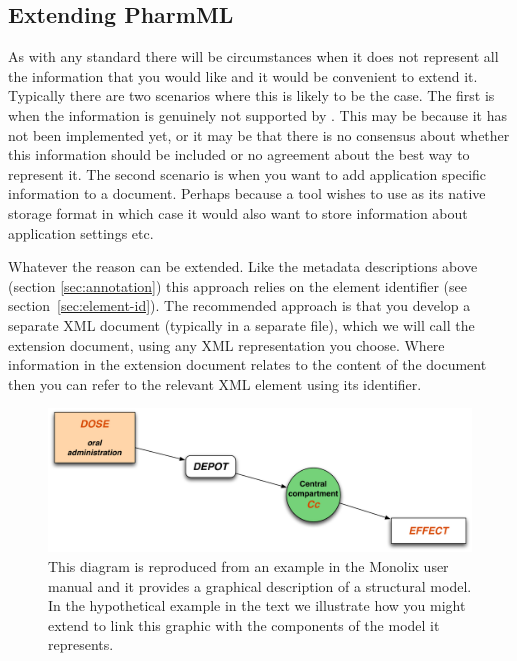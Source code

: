 \subsection{Extending PharmML}
\label{sec:extension}

As with any standard there will be circumstances when it does not
represent all the information that you would like and it would be
convenient to extend it. Typically there are two scenarios where this
is likely to be the case. The first is when the information is genuinely
not supported by \pharmml. This may be because it has not been
implemented yet, or it may be that there is no consensus about whether
this information should be included or no agreement about the best way
to represent it. The second scenario is when you want to
add application specific information to a \pharmml document. Perhaps
because a tool wishes to use \pharmml as its native storage format in
which case it would also want to store information about application
settings etc.

Whatever the reason \pharmml can be extended. Like the metadata
descriptions above (section \ref{sec:annotation}) this approach relies
on the element identifier (see section~\ref{sec:element-id}). The
recommended approach is that you develop a separate XML document
(typically in a separate file), which we will call the extension
document, using any XML representation you choose. Where information
in the extension document relates to the content of the \pharmml
document then you can refer to the relevant XML element using its
identifier.

\begin{figure}[htb]
\centering
  \includegraphics[height=0.2\textheight]{Figures/GraphicalModel}
  \caption{This diagram is reproduced from an example in the Monolix
    user manual \cite{Monolix4.1.4UserGuide:2012} and it provides a
    graphical description of a structural model. In the hypothetical
    example in the text we illustrate how you might extend \pharmml to
    link this graphic with the components of the model it represents.}
\label{fig:graphical-model}
\end{figure}

